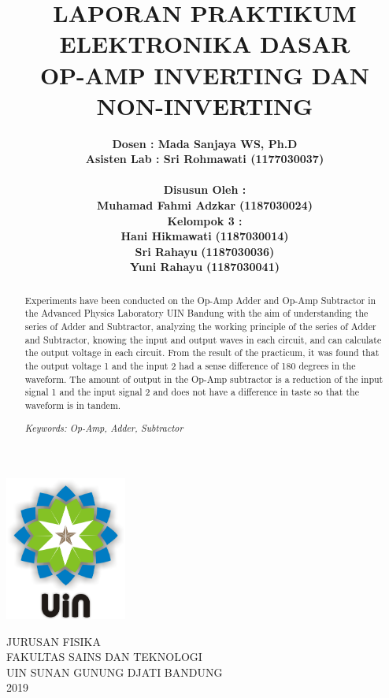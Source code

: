 \documentclass[12pt,a4paper]{article}
\begin{document}
\onehalfspacing
\begin{titlepage}

\title{\textbf{LAPORAN PRAKTIKUM ELEKTRONIKA DASAR
\\ OP-AMP INVERTING DAN NON-INVERTING}}  %
\author{\textbf {Dosen : Mada Sanjaya WS, Ph.D  }
\\ \textbf{Asisten Lab : Sri Rohmawati (1177030037)}
\\ \textbf{ }
\\ \textbf{Disusun Oleh :}
\\ \textbf{Muhamad Fahmi Adzkar} \textbf {(1187030024)}
\\ \textbf{Kelompok 3 :}
\\ \textbf{Hani Hikmawati} \textbf {(1187030014)}
\\ \textbf{Sri Rahayu} \textbf {(1187030036)}
\\ \textbf{Yuni Rahayu} \textbf {(1187030041)}}

\maketitle
\begin{center}
\vspace{1cm}
\includegraphics[width=4cm]{uin.png}
\vspace{1cm}

JURUSAN FISIKA\\
FAKULTAS SAINS DAN TEKNOLOGI\\
UIN SUNAN GUNUNG DJATI BANDUNG\\
2019\\
\end{center}
\end{titlepage}

\renewcommand\abstractname{Abstract} %
\begin{abstract} %
Experiments have been conducted on the Op-Amp Adder and Op-Amp Subtractor in the Advanced Physics Laboratory UIN Bandung with the aim of understanding the series of Adder and Subtractor, analyzing the working principle of the series of Adder and Subtractor, knowing the input and output waves in each circuit, and can calculate the output voltage in each circuit. From the result of the practicum, it was found that the output voltage 1 and the input 2 had a sense difference of 180 degrees in the waveform. The amount of output in the Op-Amp subtractor is a reduction of the input signal 1 and the input signal 2 and does not have a difference in taste so that the waveform is in tandem.

\textit{Keywords: Op-Amp, Adder, Subtractor}
\end{abstract}
\end{document}
